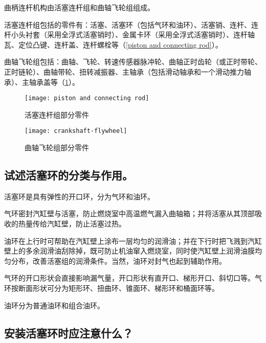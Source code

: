\documentclass[UTF8]{ctexart}
\numberwithin{figure}{section}
\numberwithin{table}{section}
\begin{document}
曲柄连杆机构由活塞连杆组和曲轴飞轮组组成。

活塞连杆组包括的零件有：活塞、活塞环（包括气环和油环）、活塞销、连杆、连杆小头衬套（采用全浮式活塞销时）、金属卡环（采用全浮式活塞销时）、连杆轴瓦、定位凸键、连杆盖、连杆螺栓等（\cref{piston and connecting rod}）。

曲轴飞轮组包括：曲轴、飞轮、转速传感器脉冲轮、曲轴正时齿轮（或正时带轮、正时链轮）、曲轴带轮、扭转减振器、主轴承（包括滑动轴承和一个滑动推力轴承）、主轴承盖等（\cref{crankshaft-flywheel}）。

\begin{figure}[htbp]
	\centering
	\begin{minipage}[b]{0.2\textwidth}
		\centering
		\texttt{[image: piston and connecting rod]}
		\caption{活塞连杆组部分零件}
		\label{piston and connecting rod}
	\end{minipage}
	\begin{minipage}[b]{0.7\textwidth}
		\centering
		\texttt{[image: crankshaft-flywheel]}
		\caption{曲轴飞轮组部分零件}
		\label{crankshaft-flywheel}
	\end{minipage}
\end{figure}

\subsection{试述活塞环的分类与作用。}

活塞环是具有弹性的开口环，分为气环和油环。

气环密封汽缸壁与活塞，防止燃烧室中高温燃气漏入曲轴箱；并将活塞从其顶部吸收的热量传给汽缸壁，防止活塞过热。

油环在上行时可帮助在汽缸壁上涂布一层均匀的润滑油；并在下行时把飞溅到汽缸壁上的多余润滑油刮除掉，既可防止机油窜入燃烧室，同时使汽缸壁上润滑油膜均匀分布，改善活塞组的润滑条件。当然，油环对封气也起到辅助作用。

气环的开口形状会直接影响漏气量，开口形状有直开口、梯形开口、斜切口等。气环按断面形状可分为矩形环、扭曲环、锥面环、梯形环和桶面环等。

油环分为普通油环和组合油环。

\subsection{安装活塞环时应注意什么？}
\end{document}

